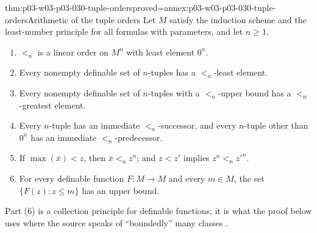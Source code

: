 \begin{hblemma}{thm:p03-w03-p03-030-tuple-orders}{proved=annex:p03-w03-p03-030-tuple-orders}{Arithmetic of the tuple orders}
Let \(M\) satisfy the induction scheme and the least-number principle for
all formulas with parameters, and let \(n\ge1\).
\begin{enumerate}
\item \(<_n\) is a linear order on \(M^n\) with least element \(0^n\).
\item Every nonempty definable set of \(n\)-tuples has a \(<_n\)-least
  element.
\item Every nonempty definable set of \(n\)-tuples with a \(<_n\)-upper bound
  has a \(<_n\)-greatest element.
\item Every \(n\)-tuple has an immediate \(<_n\)-successor, and every
  \(n\)-tuple other than \(0^n\) has an immediate \(<_n\)-predecessor.
\item If \(\max(\bar x)<z\), then \(\bar x<_nz^n\); and \(z<z'\) implies
  \(z^n<_nz'^n\).
\item For every definable function \(F:M\to M\) and every \(m\in M\), the set
  \(\{F(z):z\le m\}\) has an upper bound.
\end{enumerate}
\end{hblemma}

Part (6) is a collection principle for definable functions; it is what the
proof below uses where the source speaks of ``boundedly'' many classes
\cite[p.~207]{Schmerl1985TransferTheorems}.

